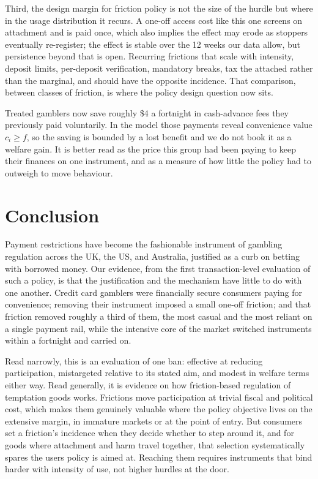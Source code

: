 \documentclass[11pt]{article}
\begin{document}
Third, the design margin for friction policy is not the size of the hurdle but where in the usage distribution it recurs. A one-off access cost like this one screens on attachment and is paid once, which also implies the effect may erode as stoppers eventually re-register; the effect is stable over the 12 weeks our data allow, but persistence beyond that is open. Recurring frictions that scale with intensity, deposit limits, per-deposit verification, mandatory breaks, tax the attached rather than the marginal, and should have the opposite incidence. That comparison, between classes of friction, is where the policy design question now sits.

Treated gamblers now save roughly \$4 a fortnight in cash-advance fees they previously paid voluntarily. In the model those payments reveal convenience value $c_i \geq f$, so the saving is bounded by a lost benefit and we do not book it as a welfare gain. It is better read as the price this group had been paying to keep their finances on one instrument, and as a measure of how little the policy had to outweigh to move behaviour.

\section{Conclusion} \label{Conclusion}

Payment restrictions have become the fashionable instrument of gambling regulation across the UK, the US, and Australia, justified as a curb on betting with borrowed money. Our evidence, from the first transaction-level evaluation of such a policy, is that the justification and the mechanism have little to do with one another. Credit card gamblers were financially secure consumers paying for convenience; removing their instrument imposed a small one-off friction; and that friction removed roughly a third of them, the most casual and the most reliant on a single payment rail, while the intensive core of the market switched instruments within a fortnight and carried on.

Read narrowly, this is an evaluation of one ban: effective at reducing participation, mistargeted relative to its stated aim, and modest in welfare terms either way. Read generally, it is evidence on how friction-based regulation of temptation goods works. Frictions move participation at trivial fiscal and political cost, which makes them genuinely valuable where the policy objective lives on the extensive margin, in immature markets or at the point of entry. But consumers set a friction's incidence when they decide whether to step around it, and for goods where attachment and harm travel together, that selection systematically spares the users policy is aimed at. Reaching them requires instruments that bind harder with intensity of use, not higher hurdles at the door.
\end{document}
